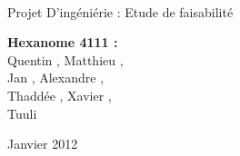 \documentclass[a4paper]{article}
\begin{document}
\begin{titlepage}
~ 
\vfill
	\begin{center}
		\begin{Huge}
		Projet D'ingéniérie : Etude de faisabilité\\
		\end{Huge} 
\vfill
		\textbf{Hexanome 4111 :} 
		\\Quentin {}, Matthieu , 
		\\Jan {}, Alexandre , 
		\\Thaddée , Xavier ,
		\\Tuuli {}
\vfill		
		\begin{Large}
		Janvier 2012
		\end{Large}
\vfill
	\begin{tabular}{|c|c|c|c|}
 	 \hline
	\end{tabular}
	\end{center}
\vfill
\end{titlepage}
\newpage
\tableofcontents
\newpage


\end{document}
